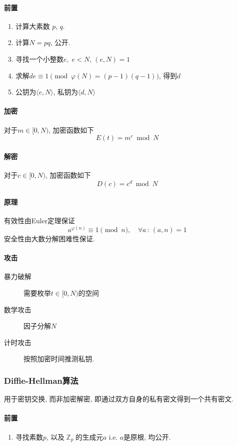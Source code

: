 \documentclass{ctexart}
\DeclareMathOperator{\Zset}{\mathbb{Z}}
\begin{document}
\paragraph{前置}
    \begin{enumerate}
        \item 计算大素数 $p$, $q$.
        \item 计算$N = pq$, 公开.
        \item 寻找一个小整数$e,\;e < N,\,(e, N) = 1$
        \item 求解$d e \equiv 1 \pmod{\varphi(N) = (p-1)(q-1)}$, 得到$d$
        \item 公钥为$\langle e, N \rangle$, 私钥为$\langle d, N \rangle$
    \end{enumerate}
\paragraph{加密}
    对于$m \in [0, N)$, 加密函数如下
    \[ E(t) = m^e \bmod N \]
\paragraph{解密}
    对于$c \in [0, N)$, 加密函数如下
    \[ D(c) = c^d \bmod N \]
\paragraph{原理}
    有效性由Euler定理保证 \[ a^{\varphi(n)} \equiv 1 \pmod{n},\quad \forall a\,:\,(a, n) = 1 \]
    安全性由大数分解困难性保证.
\paragraph{攻击}
    \begin{description}
        \item[暴力破解] 需要枚举$t \in [0, N)$的空间
        \item[数学攻击] 因子分解$N$
        \item[计时攻击] 按照加密时间推测私钥.
    \end{description}
\subsubsection{Diffie-Hellman算法}
    用于密钥交换, 而非加密解密, 即通过双方自身的私有密文得到一个共有密文.
\paragraph{前置}
    \begin{enumerate}
        \item 寻找素数$p$, 以及$\Zset_p$的生成元$a$ i.e. $a$是原根, 均公开.
    \end{enumerate}
\end{document}
